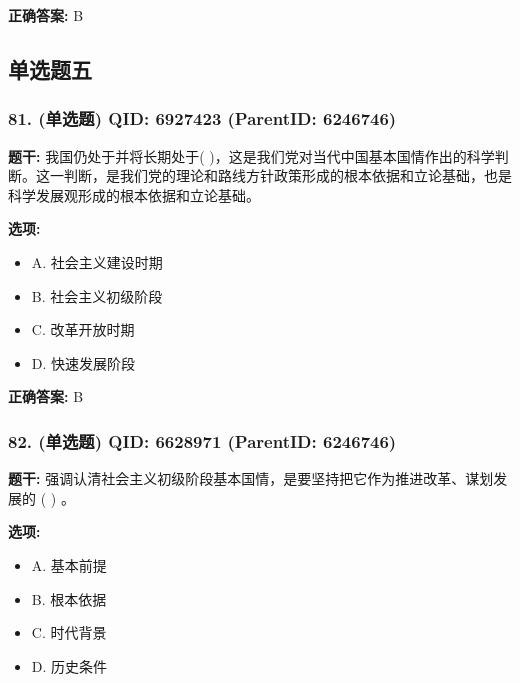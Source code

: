 \documentclass[12pt,UTF8]{ctexart}
\begin{document}
\textbf{正确答案:}
B

\vspace{0.3em}\hrulefill\vspace{0.7em}

\subsection*{单选题五}

\subsubsection*{81. (单选题) \small QID: 6927423 (ParentID: 6246746)}

\textbf{题干:}
我国仍处于并将长期处于(  )，这是我们党对当代中国基本国情作出的科学判断。这一判断，是我们党的理论和路线方针政策形成的根本依据和立论基础，也是科学发展观形成的根本依据和立论基础。



\textbf{选项:}
\begin{itemize}[leftmargin=*]

  \item A. 社会主义建设时期

  \item B. 社会主义初级阶段

  \item C. 改革开放时期

  \item D. 快速发展阶段

\end{itemize}

\textbf{正确答案:}
B

\vspace{0.3em}\hrulefill\vspace{0.7em}

\subsubsection*{82. (单选题) \small QID: 6628971 (ParentID: 6246746)}

\textbf{题干:}
强调认清社会主义初级阶段基本国情，是要坚持把它作为推进改革、谋划发展的  ( )  。



\textbf{选项:}
\begin{itemize}[leftmargin=*]

  \item A. 基本前提

  \item B. 根本依据

  \item C. 时代背景

  \item D. 历史条件

\end{itemize}
\end{document}
